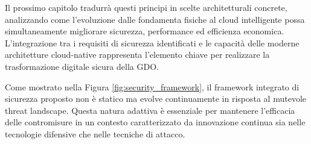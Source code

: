 Il prossimo capitolo tradurrà questi principi in scelte architetturali concrete, analizzando come l'evoluzione dalle fondamenta fisiche al cloud intelligente possa simultaneamente migliorare sicurezza, performance ed efficienza economica. L'integrazione tra i requisiti di sicurezza identificati e le capacità delle moderne architetture cloud-native rappresenta l'elemento chiave per realizzare la trasformazione digitale sicura della GDO.


Come mostrato nella Figura \ref{fig:security_framework}, il framework integrato di sicurezza proposto non è statico ma evolve continuamente in risposta al mutevole threat landscape. Questa natura adattiva è essenziale per mantenere l'efficacia delle contromisure in un contesto caratterizzato da innovazione continua sia nelle tecnologie difensive che nelle tecniche di attacco.


